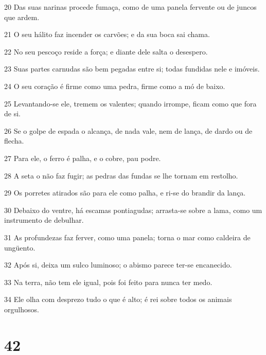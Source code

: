 \par 20 Das suas narinas procede fumaça, como de uma panela fervente ou de juncos que ardem.
\par 21 O seu hálito faz incender os carvões; e da sua boca sai chama.
\par 22 No seu pescoço reside a força; e diante dele salta o desespero.
\par 23 Suas partes carnudas são bem pegadas entre si; todas fundidas nele e imóveis.
\par 24 O seu coração é firme como uma pedra, firme como a mó de baixo.
\par 25 Levantando-se ele, tremem os valentes; quando irrompe, ficam como que fora de si.
\par 26 Se o golpe de espada o alcança, de nada vale, nem de lança, de dardo ou de flecha.
\par 27 Para ele, o ferro é palha, e o cobre, pau podre.
\par 28 A seta o não faz fugir; as pedras das fundas se lhe tornam em restolho.
\par 29 Os porretes atirados são para ele como palha, e ri-se do brandir da lança.
\par 30 Debaixo do ventre, há escamas pontiagudas; arrasta-se sobre a lama, como um instrumento de debulhar.
\par 31 As profundezas faz ferver, como uma panela; torna o mar como caldeira de ungüento.
\par 32 Após si, deixa um sulco luminoso; o abismo parece ter-se encanecido.
\par 33 Na terra, não tem ele igual, pois foi feito para nunca ter medo.
\par 34 Ele olha com desprezo tudo o que é alto; é rei sobre todos os animais orgulhosos.

\chapter{42}

